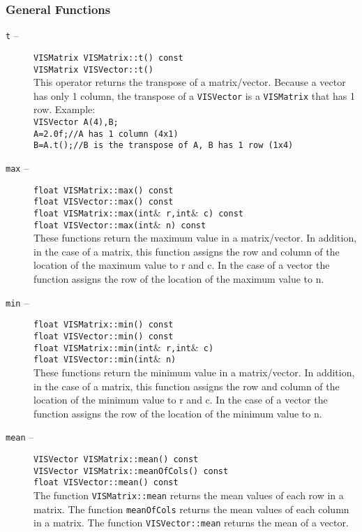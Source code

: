 \subsubsection{General Functions}
\label{ml_gf}
\begin{description}
\item[{\tt t} --]
{\tt VISMatrix VISMatrix::t() const}\\
{\tt VISMatrix VISVector::t()}\\
This operator returns the transpose of a matrix/vector.
Because a vector has only 1 column, the transpose of a {\tt VISVector}
is a {\tt VISMatrix} that has 1 row.  Example:\\
{\tt VISVector A(4),B;}\\
{\tt A=2.0f;//A has 1 column (4x1)}\\
{\tt B=A.t();//B is the transpose of A, B has 1 row (1x4)}

\item[{\tt max} --]
{\tt float VISMatrix::max() const}\\
{\tt float VISVector::max() const}\\
{\tt float VISMatrix::max(int$\&$ r,int$\&$ c) const}\\
{\tt float VISVector::max(int$\&$ n) const}\\
These functions return the maximum value in a matrix/vector.
In addition, in the case of a matrix, this function assigns
the row and column of the location of the maximum value to r and c.
In the case of a vector the function assigns the row of the
location of the maximum value to n.
\item[{\tt min} --]
{\tt float VISMatrix::min() const}\\
{\tt float VISVector::min() const}\\
{\tt float VISMatrix::min(int$\&$ r,int$\&$ c)}\\
{\tt float VISVector::min(int$\&$ n)}\\
These functions return the minimum value in a matrix/vector.
In addition, in the case of a matrix, this function assigns
the row and column of the location of the minimum value to r and c.
In the case of a vector the function assigns the row of the
location of the minimum value to n.
\item[{\tt mean} --]
{\tt VISVector VISMatrix::mean() const}\\
{\tt VISVector VISMatrix::meanOfCols() const}\\
{\tt float VISVector::mean() const}\\
The function {\tt VISMatrix::mean} returns the mean values of each
row in a matrix.
The function {\tt meanOfCols} returns the mean values of each column
in a matrix.
The function {\tt VISVector::mean} returns the mean of a vector.
\end{description}

